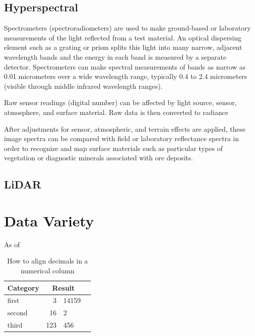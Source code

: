 \subsection{Hyperspectral}

Spectrometers (spectroradiometers) are used to make ground-based or laboratory measurements of the light reflected from a test material. An optical dispersing element such as a grating or prism splits this light into many narrow, adjacent wavelength bands and the energy in each band is measured by a separate detector. Spectrometers can make spectral measurements of bands as narrow as 0.01 micrometers over a wide wavelength range, typically 0.4 to 2.4 micrometers (visible through middle infrared wavelength ranges).



Raw sensor readings (digital number) can be affected by light source, sensor, atmosphere, and surface material. Raw data is then converted to radiance 

After adjustments for sensor,
atmospheric, and terrain effects are applied, these
image spectra can be compared with field or laboratory
reflectance spectra in order to recognize and
map surface materials such as particular types of
vegetation or diagnostic minerals associated with ore
deposits.
\subsection{LiDAR}

\section{Data Variety}

As of 


\begin{table}[h!]
\caption{How to align decimals in a numerical column}\label{tb1}
  \begin{tabular}{p{3 in} r@{.}l c}
 \hline
 Category & \multicolumn{2}{c}{Result}  & \hspace{2.2 in} \\
 \hline
  first & 3&14159 & \hspace{2.2 in} \\
  second & 16&2 & \hspace{2.2 in} \\
  third & 123&456 & \hspace{2.2 in} \\
  \hline
  \end{tabular}
\end{table}


